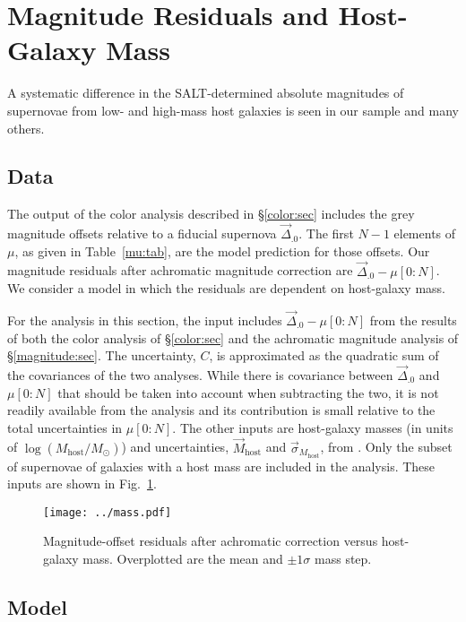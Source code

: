 \documentclass{aastex61}   	%
\begin{document}
\section{Magnitude Residuals and Host-Galaxy Mass}

A systematic difference in the SALT-determined absolute magnitudes of supernovae from low- and high-mass host galaxies is seen in
our sample and many others.

\subsection{Data}

The output of the color analysis
described in \S\ref{color:sec} includes the grey magnitude offsets relative to a fiducial supernova $\vec{\Delta}_{.0}$.
The first $N-1$ elements of $\mu$, as given in Table~\ref{mu:tab}, are the model prediction for those offsets.
Our magnitude residuals after achromatic magnitude correction are $\vec{\Delta}_{.0} - \mu[0:N]$.
We consider  a model in which the residuals are dependent
on host-galaxy mass.

For the analysis in this section, the input includes $\vec{\Delta}_{.0} - \mu[0:N]$ from
the results of both the color analysis of \S\ref{color:sec} and the achromatic magnitude analysis of 
\S\ref{magnitude:sec}.  The
uncertainty, $C$, is approximated as the quadratic sum of the covariances of the two analyses.  
While there is covariance between $\vec{\Delta}_{.0}$ and $\mu[0:N]$ that should be taken into account when
subtracting the two,  it is not readily available from the analysis
and its contribution is small relative to the total uncertainties in $\mu[0:N]$.
The other inputs are 
host-galaxy masses (in units of $\log{(M_{\mathrm{host}}/M_{\odot})}$) and uncertainties, $\vec{M}_{\text{host}}$  and
$\vec{\sigma}_{M_{\text{host}}}$,
from \citet{2013ApJ...770..108C}.  Only the subset of supernovae of galaxies with a host mass are included in the analysis.
These inputs are shown in Fig.~\ref{mass:fig}.

\begin{figure}[htbp] %
   \centering
   \texttt{[image: ../mass.pdf]}
   \caption{Magnitude-offset residuals after achromatic correction versus host-galaxy mass.   Overplotted are the mean
   and $\pm1 \sigma$ mass step.     \label{mass:fig}}
\end{figure}

\subsection{Model}
\end{document}
